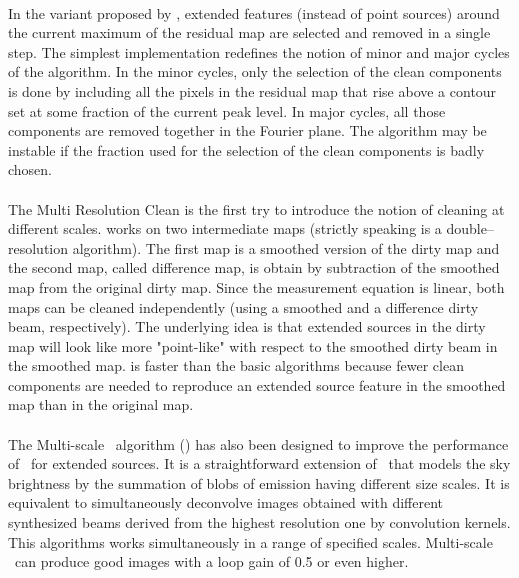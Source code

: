 \paragraph{}

In the \clean{} variant proposed by \cite{steer84}, extended features
(instead of point sources) around the current maximum of the residual map
are selected and removed in a single step. The simplest implementation
redefines the notion of minor and major cycles of the 
algorithm. In the minor cycles, only the selection of the clean components
is done by including all the pixels in the residual map that rise above a
contour set at some fraction of the current peak level. In major cycles,
all those components are removed together in the Fourier plane. The
 algorithm may be instable if the fraction used for the selection
of the clean components is badly chosen.

\paragraph{}

The Multi Resolution Clean \citep[\texttt{MRC},][]{wakker88} is the first
try to introduce the notion of cleaning at different scales. 
works on two intermediate maps (strictly speaking  is a
double--resolution \clean{} algorithm).  The first map is a smoothed
version of the dirty map and the second map, called difference map, is
obtain by subtraction of the smoothed map from the original dirty map.
Since the measurement equation is linear, both maps can be cleaned
independently (using a smoothed and a difference dirty beam, respectively).
The underlying idea is that extended sources in the dirty map will look
like more "point-like" with respect to the smoothed dirty beam in the
smoothed map.  is faster than the basic \clean{} algorithms
because fewer clean components are needed to reproduce an extended source
feature in the smoothed map than in the original map.

\paragraph{}

 The Multi-scale \clean\ algorithm (\cite{cornwell0X}) has also been
 designed to improve the performance of \clean\ for extended sources.  It is
 a straightforward extension of \clean\ that models the sky brightness by
 the summation of blobs of emission having different size scales.  It is
 equivalent to simultaneously deconvolve images obtained with different
 synthesized beams derived from the highest resolution one by convolution
 kernels. This algorithms works simultaneously in a range of specified 
 scales. Multi-scale \clean\ can produce good images with a loop gain 
 of 0.5 or even higher. 
 
